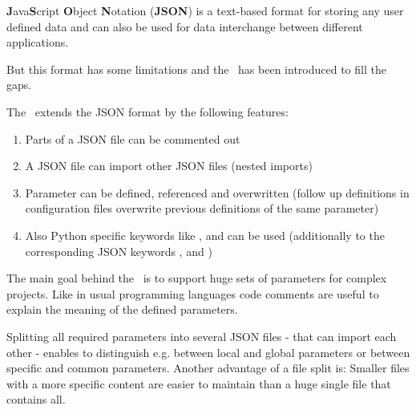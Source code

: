 



\textbf{J}ava\textbf{S}cript \textbf{O}bject \textbf{N}otation (\textbf{JSON}) is a text-based format for storing any user defined data and can also be used
for data interchange between different applications.

But this format has some limitations and the \pkg\ has been introduced to fill the gaps.

The \pkg\ extends the JSON format by the following features:

\begin{enumerate}
   \item Parts of a JSON file can be commented out
   \item A JSON file can import other JSON files (nested imports)
   \item Parameter can be defined, referenced and overwritten (follow up definitions in configuration files overwrite previous definitions of the same parameter)
   \item Also Python specific keywords like ,  and  can be used (additionally to the corresponding JSON keywords ,
          and )
\end{enumerate}

The main goal behind the \pkg\ is to support huge sets of parameters for complex projects. Like in usual programming languages code comments are useful
to explain the meaning of the defined parameters.

Splitting all required parameters into several JSON files - that can import each other - enables to distinguish e.g. between local and global parameters
or between specific and common parameters. Another advantage of a file split is: Smaller files with a more specific content are easier to maintain than
a huge single file that contains all.

